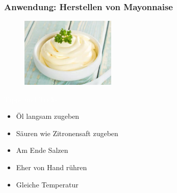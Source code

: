 \documentclass{beamer} %
\begin{document}
\begin{frame}

\frametitle{Anwendung: Herstellen von Mayonnaise}

\begin{figure}
\centering
\includegraphics[width = 0.4\textwidth]{Mayonnaise.jpg}
\end{figure}
\pause
\begin{block}{\textcolor{white}{Tipps und Tricks}}
\begin{itemize}
\item Öl langsam zugeben
\item Säuren wie Zitronensaft zugeben
\item Am Ende Salzen
\item Eher von Hand rühren
\item Gleiche Temperatur
\end{itemize}
\end{block}

\end{frame}
\end{document}
